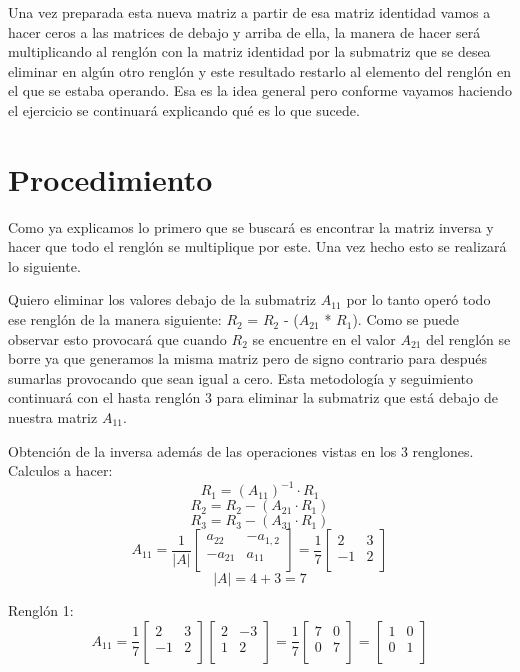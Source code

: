 \documentclass{article}
\begin{document}
Una vez preparada esta nueva matriz a partir de esa matriz identidad vamos a hacer ceros a las matrices de debajo y arriba de ella, la manera de hacer será multiplicando al renglón con la matriz identidad por la submatriz que se desea eliminar en algún otro renglón y este resultado restarlo al elemento del renglón en el que se estaba operando. 
Esa es la idea general pero conforme vayamos haciendo el ejercicio se continuará explicando qué es lo que sucede. 

\section{Procedimiento}
Como ya explicamos lo primero que se buscará es encontrar la matriz inversa y hacer que todo el renglón se multiplique por este. Una vez hecho esto se realizará lo siguiente. 

Quiero eliminar los valores debajo de la submatriz $A_{11}$ por lo tanto operó todo ese renglón de la manera siguiente: $R_2$ = $R_2$ - ($A_{21}$ * $R_{1}$). 
Como se puede observar esto provocará que cuando $R_2$ se encuentre en el valor $A_{21}$ del renglón se borre ya que generamos la misma matriz pero de signo contrario para después sumarlas provocando que sean igual a cero. 
Esta metodología y seguimiento continuará con el hasta renglón 3 para eliminar la submatriz que está debajo de nuestra matriz $A_{11}$. 

Obtención de la inversa además de las operaciones vistas en los 3 renglones. 
Calculos a hacer: 
$$ R_1 = (A_{11})^{-1} \cdot R_1$$
$$ R_2 = R_2 - (A_{21} \cdot R_1)$$
$$ R_3 = R_3 - (A_{31} \cdot R_1)$$
$$A_{11} = \frac{1}{|A|}
\begin{bmatrix}
    a_{22} & -a_{1,2} \\
    -a_{21} & a_{11} \\
\end{bmatrix} 
= \frac{1}{7}
\begin{bmatrix}
    2 & 3 \\
    -1 & 2 \\
\end{bmatrix}$$
$$|A| = 4 +3 = 7 $$

Renglón 1:
$$A_{11} = \frac{1}{7}
\begin{bmatrix}
    2 & 3 \\
    -1 & 2 \\
\end{bmatrix} 
\begin{bmatrix}
    2 & -3 \\
    1 & 2 \\
\end{bmatrix} = \frac{1}{7}
\begin{bmatrix}
    7 & 0 \\
    0 & 7 \\
\end{bmatrix} =
\begin{bmatrix}
    1 & 0 \\
    0 & 1 \\
\end{bmatrix}$$
\end{document}

